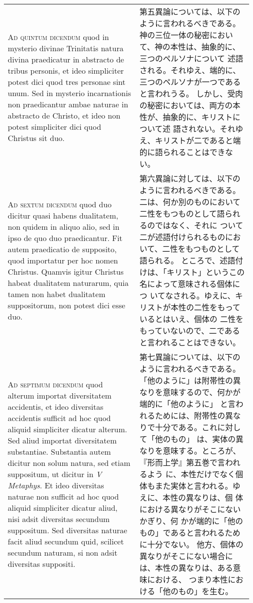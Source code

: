 \documentclass[10pt]{jsarticle} %
\begin{document}
\begin{longtable}{p{21em}p{21em}}
\\


{\scshape Ad quintum dicendum} quod in mysterio
 divinae Trinitatis natura divina praedicatur in abstracto de tribus
 personis, et ideo simpliciter potest dici quod tres personae sint
 unum. Sed in mysterio incarnationis non praedicantur ambae naturae in
 abstracto de Christo, et ideo non potest simpliciter dici quod Christus
 sit duo.


&

第五異論については、以下のように言われるべきである。
神の三位一体の秘密において、神の本性は、抽象的に、三つのペルソナについて
 述語される。それゆえ、端的に、三つのペルソナが一つであると言われうる。
しかし、受肉の秘密においては、両方の本性が、抽象的に、キリストについて述
 語されない。それゆえ、キリストが二であると端的に語られることはできない。


\\


{\scshape Ad sextum dicendum} quod duo dicitur quasi
 habens dualitatem, non quidem in aliquo alio, sed in ipso de quo duo
 praedicantur. Fit autem praedicatio de supposito, quod importatur per
 hoc nomen Christus. Quamvis igitur Christus habeat dualitatem
 naturarum, quia tamen non habet dualitatem suppositorum, non potest
 dici esse duo.


&

第六異論に対しては、以下のように言われるべきである。
二は、何か別のものにおいて二性をもつものとして語られるのではなく、それに
 ついて二が述語付けられるものにおいて、二性をもつものとして語られる。
ところで、述語付けは、「キリスト」というこの名によって意味される個体につ
 いてなされる。ゆえに、キリストが本性の二性をもっているとはいえ、個体の
 二性をもっていないので、二であると言われることはできない。


\\


{\scshape Ad septimum dicendum} quod alterum importat
 diversitatem accidentis, et ideo diversitas accidentis sufficit ad hoc
 quod aliquid simpliciter dicatur alterum. Sed aliud importat
 diversitatem substantiae. Substantia autem dicitur non solum natura,
 sed etiam suppositum, ut dicitur in {\itshape V Metaphys}. Et ideo diversitas
 naturae non sufficit ad hoc quod aliquid simpliciter dicatur aliud,
 nisi adsit diversitas secundum suppositum. Sed diversitas naturae facit
 aliud secundum quid, scilicet secundum naturam, si non adsit diversitas
 suppositi.


&

第七異論については、以下のように言われるべきである。
「他のように」は附帯性の異なりを意味するので、何かが端的に「他のように」
 と言われるためには、附帯性の異なりで十分である。これに対して「他のもの」
 は、実体の異なりを意味する。ところが、『形而上学』第五巻で言われるよう
 に、本性だけでなく個体もまた実体と言われる。ゆえに、本性の異なりは、個
 体における異なりがそこにないかぎり、何
 かが端的に「他のもの」であると言われるために十分でない。
他方、個体の異なりがそこにない場合には、本性の異なりは、ある意味における、
 つまり本性における「他のもの」を生む。



\end{longtable}
\end{document}
